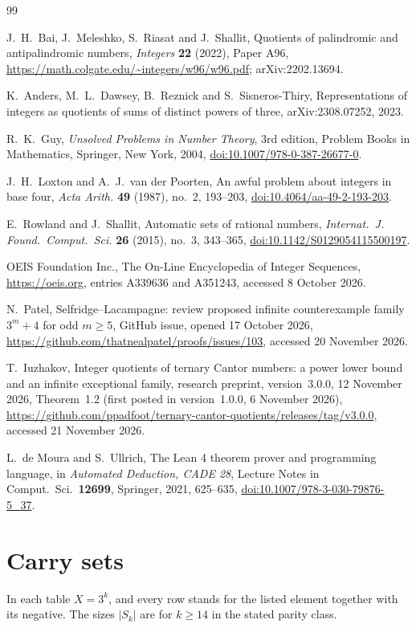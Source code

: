 \documentclass[11pt]{amsart}
\theoremstyle{definition}
\begin{document}
\begin{thebibliography}{99}

J.~H.~Bai, J.~Meleshko, S.~Riasat and J.~Shallit,
Quotients of palindromic and antipalindromic numbers,
\emph{Integers} \textbf{22} (2022), Paper A96,
\url{https://math.colgate.edu/~integers/w96/w96.pdf}; arXiv:2202.13694.

K.~Anders, M.~L.~Dawsey, B.~Reznick and S.~Sisneros-Thiry,
Representations of integers as quotients of sums of distinct powers of three,
arXiv:2308.07252, 2023.

R.~K.~Guy,
\emph{Unsolved Problems in Number Theory}, 3rd edition, Problem Books in Mathematics, Springer,
New York, 2004, \href{https://doi.org/10.1007/978-0-387-26677-0}{doi:10.1007/978-0-387-26677-0}.

J.~H.~Loxton and A.~J.~van der Poorten,
An awful problem about integers in base four,
\emph{Acta Arith.} \textbf{49} (1987), no.~2, 193--203,
\href{https://doi.org/10.4064/aa-49-2-193-203}{doi:10.4064/aa-49-2-193-203}.

E.~Rowland and J.~Shallit,
Automatic sets of rational numbers,
\emph{Internat.\ J. Found.\ Comput.\ Sci.} \textbf{26} (2015), no.~3, 343--365,
\href{https://doi.org/10.1142/S0129054115500197}{doi:10.1142/S0129054115500197}.

OEIS Foundation Inc., The On-Line Encyclopedia of Integer Sequences, \url{https://oeis.org},
entries A339636 and A351243, accessed 8 October 2026.

N.~Patel, Selfridge--Lacampagne: review proposed infinite counterexample family $3^m+4$ for odd $m\ge 5$,
GitHub issue, opened 17 October 2026,
\url{https://github.com/thatnealpatel/proofs/issues/103}, accessed 20 November 2026.

T.~Iuzhakov, Integer quotients of ternary Cantor numbers: a power lower bound and an infinite exceptional
family, research preprint, version~3.0.0, 12 November 2026, Theorem~1.2 (first posted in version~1.0.0, 6 November
2026), \url{https://github.com/ppadfoot/ternary-cantor-quotients/releases/tag/v3.0.0}, accessed 21 November 2026.

L.~de Moura and S.~Ullrich,
The Lean 4 theorem prover and programming language,
in \emph{Automated Deduction, CADE 28}, Lecture Notes in Comput.\ Sci.\ \textbf{12699}, Springer, 2021,
625--635, \href{https://doi.org/10.1007/978-3-030-79876-5_37}{doi:10.1007/978-3-030-79876-5\_37}.

\end{thebibliography}

\appendix
\section{Carry sets}\label{app:tables}

In each table $X=3^k$, and every row stands for the listed element together with its negative. The
sizes $|S_k|$ are for $k\ge 14$ in the stated parity class.


\end{document}
